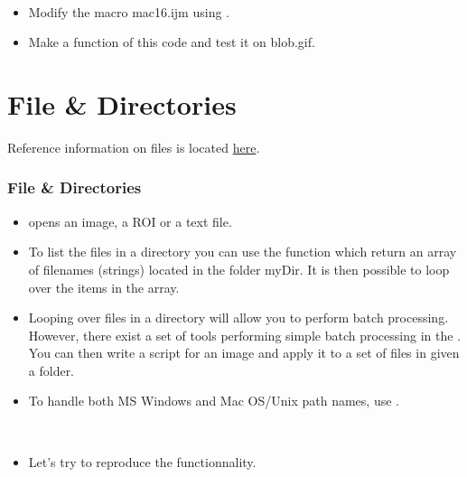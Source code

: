 \begin{frame}[fragile]
  \begin{example}~\par
    \begin{itemize}
    \item Modify the macro mac16.ijm using .
    \item Make a function of this code and test it on blob.gif.
    \end{itemize}
    
  \end{example}
\end{frame}

\section{File \& Directories}
Reference information on files is located
\href{http://rsb.info.nih.gov/ij/developer/macro/functions.html#file}{here}.
\begin{frame}
  \frametitle<presentation>{File \& Directories}
  \begin{itemize}
  \item {} opens an image, a ROI or a text file.
  \item To list the files in a directory you can use the function
     which return an array of
    filenames (strings) located in the folder myDir. It is then
    possible to loop over the items in the array.
  \item Looping over files in a directory will allow you to perform
    batch processing.  However, there exist a set of tools performing
    simple batch processing in the . You can
    then write a script for an image and apply it to a set of files in
    given a folder.
  \item To handle both MS Windows and Mac OS/Unix path names, use
    .
  \end{itemize}
\end{frame}

\begin{frame}
  \begin{example}~\par
    \begin{itemize}
    \item Let's try to reproduce the  functionnality.
      
    \end{itemize}
  \end{example}
\end{frame}

